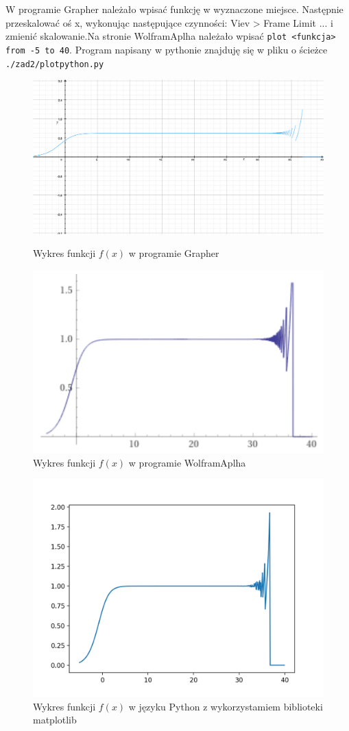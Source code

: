 \documentclass{article}
\begin{document}
W programie Grapher należało wpisać funkcję w wyznaczone miejsce. Następnie przeskalować oś x, wykonując następujące czynności: Viev > Frame Limit ... i zmienić skalowanie.Na stronie WolframAplha należało wpisać \texttt{plot <funkcja> from -5 to 40}. Program napisany w pythonie znajduję się w pliku o ścieżce \texttt{./zad2/plotpython.py}

\begin{figure}[h!]
    \centering
    \includegraphics[width=12cm]{./zad2/wykresGrapher.jpg}
    \caption{Wykres funkcji \(f(x)\) w programie Grapher}
    
    \includegraphics[width=12cm]{./zad2/wykresWolfram.png}
    \caption{Wykres funkcji \(f(x)\) w programie WolframAplha}    
\end{figure}

\begin{figure}
    \includegraphics[width=12cm]{./zad2/wykresPython.png}
    \caption{Wykres funkcji \(f(x)\) w języku Python z wykorzystamiem biblioteki matplotlib}
\end{figure}
\end{document}
